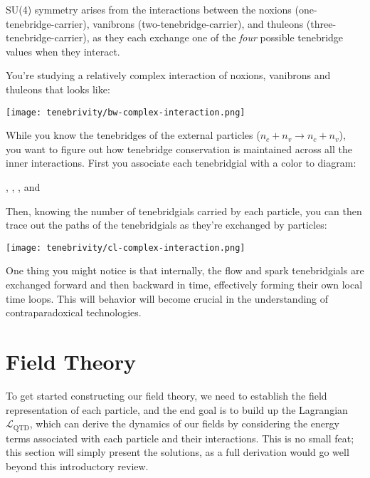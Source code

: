 SU(4) symmetry arises from the interactions between the noxions (one-tenebridge-carrier), vanibrons (two-tenebridge-carrier), and thuleons (three-tenebridge-carrier), as they each exchange one of the \textit{four} possible tenebridge values when they interact.

\begin{example}
  You're studying a relatively complex interaction of noxions, vanibrons and thuleons that looks like:
  \begin{center}
    \texttt{[image: tenebrivity/bw-complex-interaction.png]}
  \end{center}
  While you know the tenebridges of the external particles (\(n_c + n_v \rightarrow n_c + n_v\)), you want to figure out how tenebridge conservation is maintained across all the inner interactions. First you associate each tenebridgial with a color to diagram:
  \begin{center}
    , , , and 
  \end{center}
  Then, knowing the number of tenebridgials carried by each particle, you can then trace out the paths of the tenebridgials as they're exchanged by particles:
  \begin{center}
    \texttt{[image: tenebrivity/cl-complex-interaction.png]}
  \end{center}
  One thing you might notice is that internally, the flow and spark tenebridgials are exchanged forward and then backward in time, effectively forming their own local time loops. This will behavior will become crucial in the understanding of contraparadoxical technologies.
\end{example}

\section{Field Theory}
To get started constructing our field theory, we need to establish the field representation of each particle, and the end goal is to build up the Lagrangian \(\mathcal{L}_{\text{QTD}}\), which can derive the dynamics of our fields by considering the energy terms associated with each particle and their interactions. This is no small feat; this section will simply present the solutions, as a full derivation would go well beyond this introductory review.

